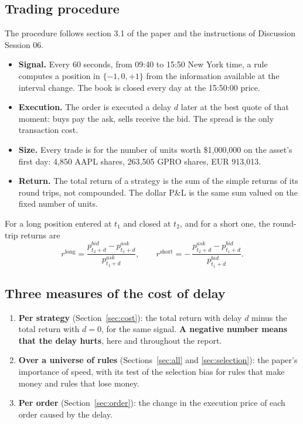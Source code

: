 \documentclass[11pt]{article}
\begin{document}
\subsection{Trading procedure}

The procedure follows section 3.1 of the paper and the instructions of Discussion
Session 06.

\begin{itemize}
  \item \textbf{Signal.} Every 60 seconds, from 09:40 to 15:50 New York time, a
        rule computes a position in $\{-1, 0, +1\}$ from the information available
        at the interval change. The book is closed every day at the 15:50:00
        price.
  \item \textbf{Execution.} The order is executed a delay $d$ later at the best
        quote of that moment: buys pay the ask, sells receive the bid. The spread
        is the only transaction cost.
  \item \textbf{Size.} Every trade is for the number of units worth
        \$1{,}000{,}000 on the asset's first day: 4{,}850 AAPL shares, 263{,}505
        GPRO shares, EUR 913{,}013.
  \item \textbf{Return.} The total return of a strategy is the sum of the simple
        returns of its round trips, not compounded. The dollar P\&L is the same
        sum valued on the fixed number of units.
\end{itemize}

For a long position entered at $t_1$ and closed at $t_2$, and for a short one,
the round-trip returns are
\[
  r^{\text{long}} = \frac{p^{bid}_{t_2+d} - p^{ask}_{t_1+d}}{p^{ask}_{t_1+d}},
  \qquad
  r^{\text{short}} = -\,\frac{p^{ask}_{t_2+d} - p^{bid}_{t_1+d}}{p^{bid}_{t_1+d}} .
\]

\subsection{Three measures of the cost of delay}

\begin{enumerate}
  \item \textbf{Per strategy} (Section~\ref{sec:cost}): the total return with
        delay $d$ minus the total return with $d = 0$, for the same signal.
        \textbf{A negative number means that the delay hurts}, here and throughout
        the report.
  \item \textbf{Over a universe of rules} (Sections~\ref{sec:all} and
        \ref{sec:selection}): the paper's importance of speed, with its test of
        the selection bias for rules that make money and rules that lose money.
  \item \textbf{Per order} (Section~\ref{sec:order}): the change in the execution
        price of each order caused by the delay.
\end{enumerate}
\end{document}
